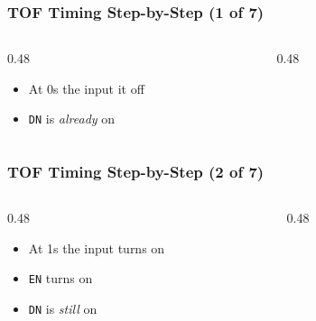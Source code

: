 \begin{frame}
    \frametitle{TOF Timing Step-by-Step (1 of 7)}

    \begin{columns}
        \begin{column}{0.48\linewidth}
            \begin{itemize}
                \item At 0s the input it off
                \item \texttt{DN} is \emph{already} on
            \end{itemize}
        \end{column}
        \begin{column}{0.48\linewidth}
            \begin{figure}
                \centering
                \resizebox{\columnwidth}{!}{
                    
                }
            \end{figure}  
        \end{column}
    \end{columns}
\end{frame}

\begin{frame}
    \frametitle{TOF Timing Step-by-Step (2 of 7)}

    \begin{columns}
        \begin{column}{0.48\linewidth}
            \begin{itemize}
                \item At 1s the input turns on
                \item \texttt{EN} turns on
                \item \texttt{DN} is \emph{still} on
            \end{itemize}
        \end{column}
        \begin{column}{0.48\linewidth}
            \begin{figure}
                \centering
                \resizebox{\columnwidth}{!}{
                    
                }
            \end{figure}  
        \end{column}
    \end{columns}
\end{frame}

